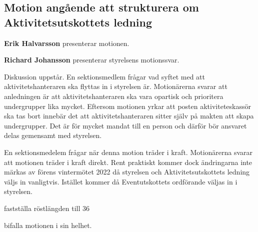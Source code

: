 \documentclass[../protokoll_extramote_2021.tex]{subfiles}
\begin{document}
\subsection{Motion angående att strukturera om Aktivitetsutskottets ledning}
\textbf{Erik Halvarsson} presenterar motionen.

\textbf{Richard Johansson} presenterar styrelsens motionssvar.

Diskussion uppstår. En sektionsmedlem frågar vad syftet med att aktivitetshanteraren ska flyttas in i styrelsen är. Motionärerna svarar att anledningen är att aktivitetshanteraren ska vara opartisk och prioritera undergrupper lika mycket. Eftersom motionen yrkar att posten aktiviteteskassör ska tas bort innebär det att aktivitetshanteraren sitter själv på makten att skapa undergrupper. Det är för mycket mandat till en person och därför bör ansvaret delas gemensamt med styrelsen.

En sektionsmedelem frågar när denna motion träder i kraft. Motionärerna svarar att motionen träder i kraft direkt. Rent praktiskt kommer dock ändringarna inte märkas av förens vintermötet 2022 då styrelsen och Aktivitetsutskottets ledning väljs in vanligtvis. Istället kommer då Eventutskottets ordförande väljas in i styrelsen.

\motetbeslutar
\att{} fastställa röstlängden till 36

\motetbeslutar
\att{} bifalla motionen i sin helhet.
\end{document}
